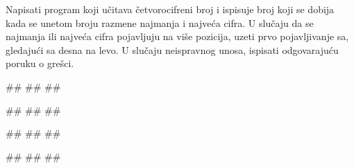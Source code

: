 \begin{Exercise}[label=KT_NG_15] 
 Napisati program koji učitava četvorocifreni broj i ispisuje broj koji se dobija 
 kada se unetom broju razmene najmanja i najveća cifra.  
 U slučaju da se najmanja ili najveća cifra pojavljuju na više pozicija, 
 uzeti prvo pojavljivanje sa, gledajući sa desna na levo.
 U slučaju neispravnog unosa, ispisati odgovarajuću poruku o grešci.
 
\begin{miditest}
\begin{upotreba}{1}
#\naslovInt#
##
##
\end{upotreba}
\end{miditest}
\begin{miditest}
\begin{upotreba}{2}
#\naslovInt#
##
##
\end{upotreba}
\end{miditest}

\begin{miditest}
\begin{upotreba}{3}
#\naslovInt#
##
##
\end{upotreba}
\end{miditest}
\begin{miditest}
\begin{upotreba}{4}
#\naslovInt#
##
##
\end{upotreba}
\end{miditest}

\end{Exercise}
\ifresenja
 \begin{Answer}[ref=KT_NG_15]
\end{Answer}
\fi


